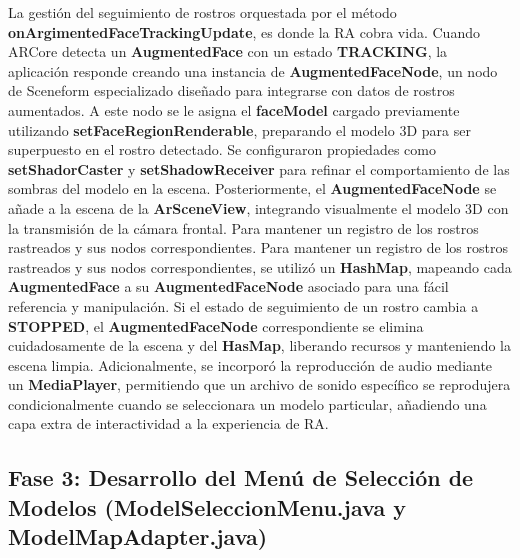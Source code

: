 \documentclass[conference]{IEEEtran}
\begin{document}
        La gestión del seguimiento de rostros orquestada por el método \textbf{onArgimentedFaceTrackingUpdate}, es donde la RA cobra vida. Cuando ARCore detecta un \textbf{AugmentedFace} con un estado \textbf{TRACKING}, la aplicación responde creando una instancia de \textbf{AugmentedFaceNode},  un nodo de Sceneform especializado diseñado para integrarse con datos de rostros aumentados. A este nodo se le asigna el \textbf{faceModel} cargado previamente utilizando \textbf{setFaceRegionRenderable}, preparando el modelo 3D para ser superpuesto en el rostro detectado. Se configuraron propiedades como \textbf{setShadorCaster} y \textbf{setShadowReceiver} para refinar el comportamiento de las sombras del modelo en la escena. Posteriormente, el \textbf{AugmentedFaceNode} se añade a la escena de la \textbf{ArSceneView}, integrando visualmente el modelo 3D con la transmisión de la cámara frontal. Para mantener un registro de los rostros rastreados y sus nodos correspondientes. Para mantener un registro de los rostros rastreados y sus nodos correspondientes, se utilizó un \textbf{HashMap}, mapeando cada \textbf{AugmentedFace} a su \textbf{AugmentedFaceNode} asociado para una fácil referencia y manipulación. Si el estado de seguimiento de un rostro cambia a \textbf{STOPPED}, el \textbf{AugmentedFaceNode} correspondiente se elimina cuidadosamente de la escena y del \textbf{HasMap}, liberando recursos y manteniendo la escena limpia. Adicionalmente, se incorporó la reproducción de audio mediante un \textbf{MediaPlayer}, permitiendo que un archivo de sonido específico se reprodujera condicionalmente cuando se seleccionara un modelo particular, añadiendo una capa extra de interactividad a la experiencia de RA.

    \subsection{Fase 3: Desarrollo del Menú de Selección de Modelos (ModelSeleccionMenu.java y ModelMapAdapter.java)}
\end{document}
